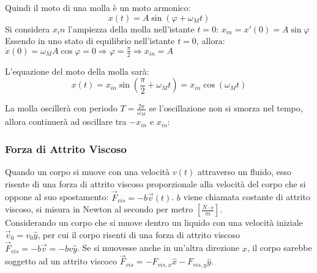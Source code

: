 \documentclass{article}
\numberwithin{equation}{subsection}
\begin{document}
Quindi il moto di una molla è un moto armonico:
\begin{equation*}
    x(t)=A\sin(\varphi + \omega_Mt)
\end{equation*}
Si considera $x_in$ l'ampiezza della molla nell'istante $t=0$:
$x_{in}=x'(0)=A\sin\varphi$
Essendo in uno stato di equilibrio nell'istante $t=0$, allora: 
$\dot x(0)=\omega_MA\cos\varphi=0\Rightarrow\varphi=\displaystyle\frac{\pi}{2}\Rightarrow x_{in}=A$

L'equazione del moto della molla sarà:
\begin{equation}
    x(t)=x_{in}\sin\left(\displaystyle\frac{\pi}{2}+\omega_Mt\right)=x_{in}\cos(\omega_Mt)
\end{equation}

La molla oscillerà con periodo $T=\displaystyle\frac{2\pi}{\omega_M}$ 
se l'oscillazione non si smorza nel tempo, allora 
continuerà ad oscillare tra $-x_{in}$ e $x_{in}$:

\begin{center}\end{center}

\subsubsection{Forza di Attrito Viscoso}
Quando un corpo si muove con una velocità $v(t)$ attraverso 
un fluido, esso risente di una forza di attrito viscoso 
proporzionale alla velocità del corpo che si oppone al 
suo spostamento: $\vec{F}_{vis}=-b\vec{v}(t)$. $b$ viene 
chiamata costante di attrito viscoso, si misura in Newton al 
secondo per metro $\left[\displaystyle\frac{N\cdot s}{m}\right]$.
\\
Considerando un corpo che si muove dentro un liquido con una velocità iniziale $\vec{v}_0=v_{0}\hat{y}$, per cui il corpo risenti di una forza di attrito viscoso $\vec{F}_{vis}=-b\vec{v}=-bv\hat{y}$. 
Se si muovesse anche in un'altra direzione $x$, il corpo sarebbe soggetto ad un attrito viscoco $\vec{F}_{vis}=-F_{vis,x}\hat{x}-F_{vis,y}\hat y$. 
\end{document}
